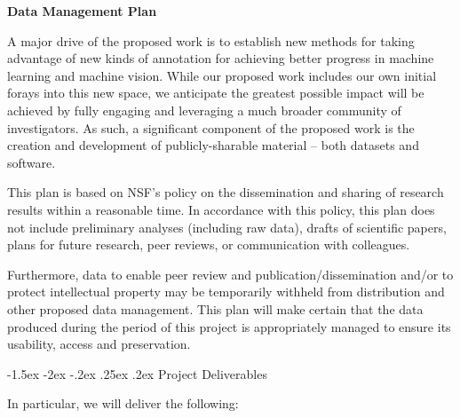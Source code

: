 \documentclass{nsfproposal}
\makeatletter
\renewcommand\section{\@startsection {section}{1}{\z@}%
                                   {-1.5ex \@plus -2ex \@minus -.2ex}%
                                   {.25ex \@plus.2ex}%
                                   {\normalfont\Large\bfseries}}
\theoremstyle{definition}
\makeatother
\begin{document}
	

\begin{center}
{\Large{\bf Data Management Plan}}
\end{center}

A major drive of the proposed work is to establish new methods for taking advantage of new kinds of annotation for achieving better progress in machine learning and machine vision.
While our proposed work includes our own initial forays into this new space, we anticipate the greatest possible impact will be achieved by fully engaging and leveraging a much broader community of investigators.
As such, a significant component of the proposed work is the creation and development of publicly-sharable material -- both datasets and software.

This plan is based on NSF's policy on the dissemination and sharing of research results within a reasonable time. In accordance with this policy, this plan does not include preliminary analyses (including raw data), drafts of scientific papers, plans for future research, peer reviews, or communication with colleagues.

Furthermore, data to enable peer review and publication/dissemination and/or to protect intellectual property may be temporarily withheld from distribution and other proposed data management. This plan will make certain that the data produced during the period of this project is appropriately managed to ensure its usability, access and preservation.

\section{Project Deliverables}

In particular, we will deliver the following:
\end{document}
